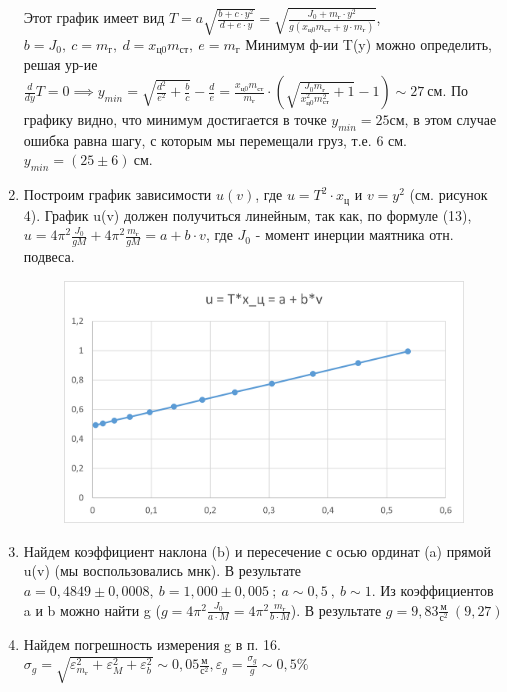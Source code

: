 \documentclass[a4paper,12pt]{article} %
\begin{document}
\begin{enumerate}
Этот график имеет вид $T = a\sqrt{\frac{b+c \cdot y^2}{d+e \cdot y}} = \sqrt{\frac{J_0 + m_{\text{г}} \cdot y^2}{g (x_{\text{ц0}} m_{\text{ст}} + y \cdot m_{\text{г}})}}$,
$b = J_0,\ c = m_{\text{г}},\ d = x_{\text{ц0}} m_{\text{ст}},\ e = m_{\text{г}}$
Минимум ф-ии T(y) можно определить, решая ур-ие
$\frac{d}{dy} T = 0 \implies y_{min} = \sqrt{\frac{d^2}{e^2} + \frac{b}{c}} - \frac{d}{e} =
	\frac{x_\text{ц0} m_\text{ст}}{m_\text{г}} \cdot (\sqrt{\frac{J_0 m_\text{г}}{x_\text{ц0}^2 m_\text{ст}^2} + 1} - 1) \sim 27\ \text{см}$.
По графику видно, что минимум достигается в точке $ y_{min} = 25 \text{см} $, в этом случае ошибка равна шагу, с которым мы перемещали груз, т.е. 6 см.
$ y_{min} = (25 \pm 6)\ \text{см} $.

\item Построим график зависимости $u(v)$, где $u = T^2 \cdot x_{\text{ц}}$ и $v = y^2$ (см. рисунок 4). График u(v) должен получиться линейным, так как, по формуле (13), $u = 4\pi^2 \frac{J_0}{gM} + 4\pi^2 \frac{m_{\text{г}}}{gM} = a + b \cdot v$, где $J_0$ - момент инерции маятника отн. подвеса.

\begin{figure} [H]
	\center
	\includegraphics[scale = 0.8]{data/u(v).png}
\end{figure}

\item Найдем коэффициент наклона (b) и пересечение с осью ординат (a) прямой u(v) (мы воспользовались мнк). В результате $a = 0,4849 \pm 0,0008,\ b = 1,000 \pm 0,005\ ;\ a \sim 0,5\ ,\ b \sim 1$. Из коэффициентов a и b можно найти g ($g = 4\pi^2 \frac{J_0}{a \cdot M} = 4\pi^2 \frac{m_{\text{г}}}{b \cdot M}$).
В результате $ g = 9,83 \frac{\text{м}}{\text{с}^2}\ (9,27)$

\item Найдем погрешность измерения g в п. 16.
$ \sigma_g = \sqrt{\varepsilon_{m_{\text{г}}}^2 + \varepsilon_{M}^2 + \varepsilon_{b}^2} \sim 0,05 \frac{\text{м}}{\text{с}^2}, \varepsilon_g = \frac{\sigma_g}{g} \sim 0,5\% $


\end{enumerate}
\end{document}
